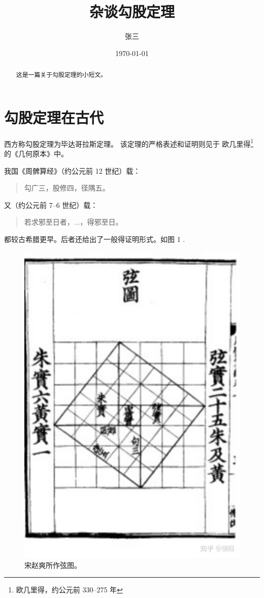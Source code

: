 \documentclass[UTF8]{ctexart}
\title{杂谈勾股定理}
\author{张三}
\date{\today}
\begin{document}
    \maketitle

    \begin{abstract}
        这是一篇关于勾股定理的小短文。
    \end{abstract}

    \tableofcontents
    
    \section{勾股定理在古代}
        西方称勾股定理为毕达哥拉斯定理\cite{Kline}。
        该定理的严格表述和证明则见于
        欧几里得\footnote{欧几里得，约公元前 330--275 年}
        的《几何原本》中。

        我国《周髀算经》（约公元前 12 世纪）载：
        \begin{quote}
            \kaishu
            勾广三，股修四，径隅五。
        \end{quote}
        又（约公元前 7--6 世纪）载：
        \begin{quote}
            \kaishu
            若求邪至日者，...，得邪至日。
        \end{quote}
        都较古希腊更早。后者还给出了一般得证明形式。如图 1 \cite{quanjing}.
        \newpage
        \par

        \begin{figure}[ht]
            \centering
            \includegraphics[scale=0.5]{xiantu.jpg}
            \caption{宋赵爽所作弦图。}
        \end{figure}
\end{document}
